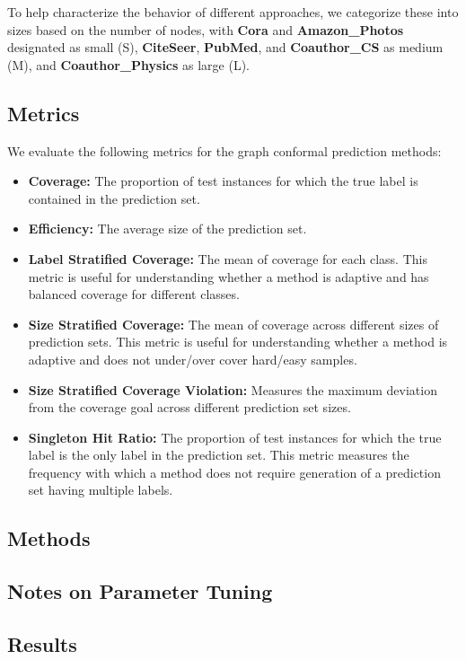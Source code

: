 To help characterize the behavior of different approaches, we categorize these into sizes based on the number of nodes, with \textbf{Cora} and \textbf{Amazon\_Photos} designated as small (S), \textbf{CiteSeer}, \textbf{PubMed}, and \textbf{Coauthor\_CS} as medium (M), and \textbf{Coauthor\_Physics} as large (L).

\subsection{Metrics}
We evaluate the following metrics for the graph conformal prediction methods:
\begin{itemize}
    \item \textbf{Coverage:} The proportion of test instances for which the true label is contained in the prediction set.
    \item \textbf{Efficiency:} The average size of the prediction set.
    \item \textbf{Label Stratified Coverage:} The mean of coverage for each class. This metric is useful for understanding whether a method is adaptive and has balanced coverage for different classes.
    \item \textbf{Size Stratified Coverage:} The mean of coverage across different sizes of prediction sets. This metric is useful for understanding whether a method is adaptive and does not under/over cover hard/easy samples.
    \item \textbf{Size Stratified Coverage Violation:} Measures the maximum deviation from the coverage goal across different prediction set sizes. 
    \item \textbf{Singleton Hit Ratio:} The proportion of test instances for which the true label is the only label in the prediction set. This metric measures the frequency with which a method does not require generation of a prediction set having multiple labels.
\end{itemize}

\subsection{Methods}

\subsection{Notes on Parameter Tuning}

\subsection{Results}